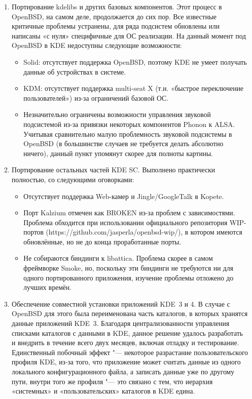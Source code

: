 \documentclass[10pt, a5paper]{article}
\begin{document}
\begin{enumerate}
 \item Портирование kdelibs и других базовых компонентов. Этот процесс в OpenBSD, на самом деле, продолжается до сих пор. Все известные критичные проблемы устранены, для ряда подсистем обновлены или написаны «с нуля» специфичные для ОС реализации. На данный момент под OpenBSD в KDE недоступны следующие возможности:
\begin{itemize}
 \item Solid: отсутствует поддержка OpenBSD, поэтому KDE не умеет получать данные об устройствах в системе.
 \item KDM: отсутствует поддержка multi-seat X (т.н. «быстрое переключение пользователей») из-за ограничений базовой ОС.
 \item Незначительно ограничены возможности управления звуковой подсистемой из-за привязки некоторых компонентов Phonon к ALSA. Учитывая сравнительно малую проблемность звуковой подсистемы в OpenBSD (в большинстве случаев не требуется делать абсолютно ничего), данный пункт упомянут скорее для полноты картины.
\end{itemize}
 \item Портирование остальных частей KDE SC. Выполнено практически полностью, со следующими оговорками:
\begin{itemize}
 \item Отсутствует поддержка Web-камер и Jingle/GoogleTalk в Kopete.
 \item Порт Kalzium отмечен как BROKEN из-за проблем с зависимостями. Проблема обходится при использовании официального репозитория WIP-портов (https://github.com/\linebreak{}jas\-per\-la/open\-bsd-wip/), в котором имеются обновлённые, но не до конца проработанные порты.
 \item Не собираются биндинги к libattica. Проблема скорее в самом фреймворке Smoke, но, поскольку эти биндинги не требуются ни для одного портированного приложения, изучение проблемы отложено до лучших времён.
\end{itemize}
 \item Обеспечение совместной установки приложений KDE~3 и 4. В случае с OpenBSD для этого была переименована часть каталогов, в которых хранятся данные приложений KDE~3. Благодаря централизованности управления списками каталогов с данными в KDE, данное решение удалось разработать и внедрить в течение всего двух месяцев, включая отладку и тестирование. Единственный побочный эффект "--- некоторое разрастание пользовательского профиля KDE, из-за того, что приложение может считать данные из одного локального конфигурационного файла, а записать данные уже по другому пути, внутри того же профиля "--- это связано с тем, что иерархия «системных» и «пользовательских» каталогов в KDE едина.


\end{enumerate}
\end{document}
